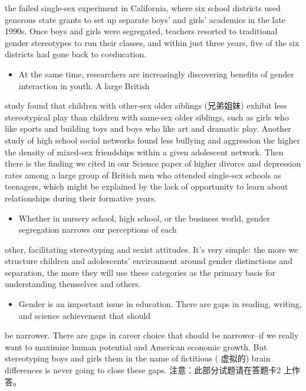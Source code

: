 \documentclass[UTF8,11pt]{ctexart}
\begin{document}
the failed single-sex experiment in California, where six school districts used generous state grants to set up separate boys' and girls' academics in the late 1990s. Once boys and girls were segregated, teachers resorted to traditional gender stereotypes to run their classes, and within just three years, five of the six districts had gone back to coeducation.


\begin{itemize}[leftmargin=2em,itemsep=.2em,topsep=.4em]\item[M.] At the same time, researchers are increasingly discovering benefits of gender interaction in youth. A large British
\end{itemize}

study found that children with other-sex older siblings (兄弟姐妹) exhibit less stereotypical play than children with same-sex older siblings, such as girls who like sports and building toys and boys who like art and dramatic play. Another study of high school social networks found less bullying and aggression the higher the density of mixed-sex friendships within a given adolescent network. Then there is the finding we cited in our Science paper of higher divorce and depression rates among a large group of British men who attended single-sex schools as teenagers, which might be explained by the lack of opportunity to learn about relationships during their formative years.


\begin{itemize}[leftmargin=2em,itemsep=.2em,topsep=.4em]\item[N.] Whether in nursery school, high school, or the business world, gender segregation narrows our perceptions of each
\end{itemize}

other, facilitating stereotyping and sexist attitudes. It's very simple: the more we structure children and adolescents' environment around gender distinctions and separation, the more they will use these categories as the primary basis for understanding themselves and others.


\begin{itemize}[leftmargin=2em,itemsep=.2em,topsep=.4em]\item[O.] Gender is an important issue in education. There are gaps in reading, writing, and science achievement that should
\end{itemize}

be narrower. There are gaps in career choice that should be narrower--if we really want to maximize human potential and American economic growth. But stereotyping boys and girls them in the name of fictitious ( 虚拟的) brain differences is never going to close these gaps. 注意：此部分试题请在答题卡2 上作答。
\end{document}
